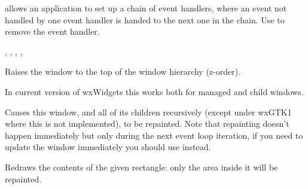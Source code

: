  allows
an application to set up a chain of event handlers, where an event not handled by one event handler is
handed to the next one in the chain. Use  to
remove the event handler.


,\rtfsp
{},\rtfsp
{},\rtfsp
{},\rtfsp
{}


\label{wxwindowraise}


Raises the window to the top of the window hierarchy (z-order).

In current version of wxWidgets this works both for managed and child windows.




\label{wxwindowrefresh}


Causes this window, and all of its children recursively (except under wxGTK1
where this is not implemented), to be repainted. Note that repainting doesn't
happen immediately but only during the next event loop iteration, if you need
to update the window immediately you should use 
instead.







\label{wxwindowrefreshrect}


Redraws the contents of the given rectangle: only the area inside it will be
repainted.

